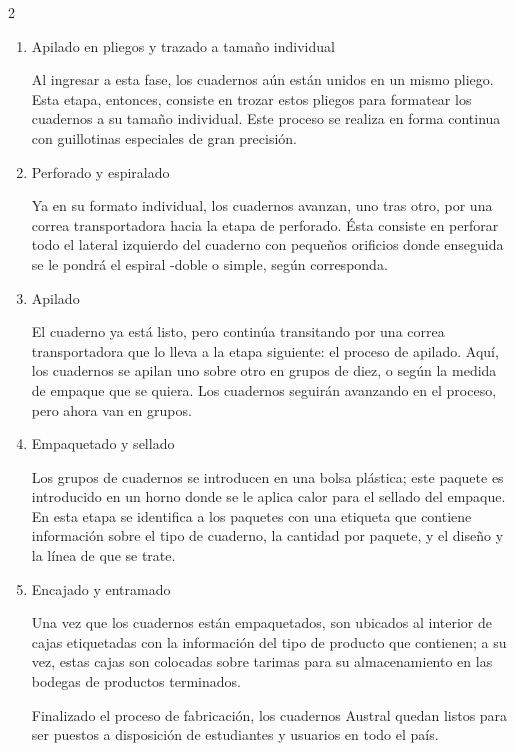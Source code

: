 \documentclass[../main]{subfiles}
\begin{document}
\begin{multicols}{2}
\begin{enumerate}
\item Apilado en pliegos y trazado a tamaño individual

Al ingresar a esta fase, los cuadernos aún están unidos en un mismo pliego. Esta etapa, entonces, consiste en trozar estos pliegos para formatear los cuadernos a su tamaño individual. Este proceso se realiza en forma continua con guillotinas especiales de gran precisión.

\item Perforado y espiralado

Ya en su formato individual, los cuadernos avanzan, uno tras otro, por una correa transportadora hacia la etapa de perforado. Ésta consiste en perforar todo el lateral izquierdo del cuaderno con pequeños orificios donde enseguida se le pondrá el espiral -doble o simple, según corresponda.

\item Apilado

El cuaderno ya está listo, pero continúa transitando por una correa transportadora que lo lleva a la etapa siguiente: el proceso de apilado. Aquí, los cuadernos se apilan uno sobre otro en grupos de diez, o según la medida de empaque que se quiera. Los cuadernos seguirán avanzando en el proceso, pero ahora van en grupos.

\item Empaquetado y sellado

Los grupos de cuadernos se introducen en una bolsa plástica; este paquete es introducido en un horno donde se le aplica calor para el sellado del empaque. En esta etapa se identifica a los paquetes con una etiqueta que contiene información sobre el tipo de cuaderno, la cantidad por paquete, y el diseño y la línea de que se trate.

\item Encajado y entramado

Una vez que los cuadernos están empaquetados, son ubicados al interior de cajas etiquetadas con la información del tipo de producto que contienen; a su vez, estas cajas son colocadas sobre tarimas para su almacenamiento en las bodegas de productos terminados.

Finalizado el proceso de fabricación, los cuadernos Austral quedan listos para ser puestos a disposición de estudiantes y usuarios en todo el país.

\end{enumerate}
\end{multicols}
\newpage
{}
\end{document}
